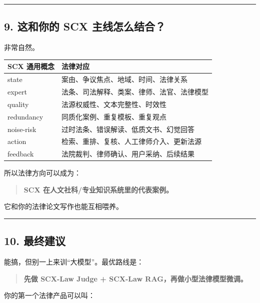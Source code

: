 \documentclass[
  12pt,
]{ctexart}
\begin{document}
\begin{center}\rule{0.5\linewidth}{0.5pt}\end{center}

\subsection{9. 这和你的 SCX
主线怎么结合？}\label{ux8fd9ux548cux4f60ux7684-scx-ux4e3bux7ebfux600eux4e48ux7ed3ux5408}

非常自然。

\begin{longtable}[]{@{}ll@{}}
\toprule\noalign{}
SCX 通用概念 & 法律对应 \\
\midrule\noalign{}
\endhead
\bottomrule\noalign{}
\endlastfoot
state & 案由、争议焦点、地域、时间、法律关系 \\
expert & 法条、司法解释、类案、律师、法官、法律模型 \\
quality & 法源权威性、文本完整性、时效性 \\
redundancy & 同质化案例、重复模板、重复观点 \\
noise-risk & 过时法条、错误解读、低质文书、幻觉回答 \\
action & 检索、重排、复核、人工律师介入、更新法源 \\
feedback & 法院裁判、律师确认、用户采纳、后续结果 \\
\end{longtable}

所以法律方向可以成为：

\begin{quote}
\textbf{SCX 在人文社科/专业知识系统里的代表案例。}
\end{quote}

它和你的法律论文写作也能互相喂养。

\begin{center}\rule{0.5\linewidth}{0.5pt}\end{center}

\subsection{10. 最终建议}\label{ux6700ux7ec8ux5efaux8bae-4}

能搞，但别一上来训``大模型''。最优路线是：

\begin{quote}
\textbf{先做 SCX-Law Judge + SCX-Law RAG，再做小型法律模型微调。}
\end{quote}

你的第一个法律产品可以叫：
\end{document}
